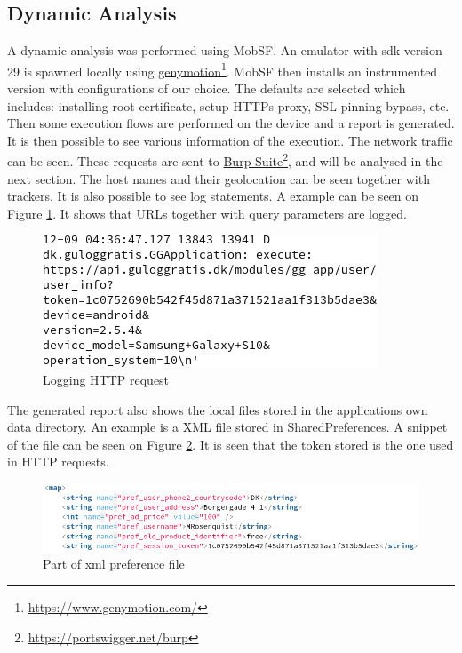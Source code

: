 \subsection{Dynamic Analysis}
A dynamic analysis was performed using MobSF. An emulator with sdk version 29 is spawned locally using \href{https://www.genymotion.com/}{genymotion}\footnote{\href{https://www.genymotion.com/}{https://www.genymotion.com/}}. MobSF then installs an instrumented version with configurations of our choice. The defaults are selected which includes: installing root certificate, setup HTTPs proxy, SSL pinning bypass, etc. Then some execution flows are performed on the device and a report is generated. It is then possible to see various information of the execution. The network traffic can be seen. These requests are sent to \href{https://portswigger.net/burp}{Burp Suite}\footnote{\href{https://portswigger.net/burp}{https://portswigger.net/burp}}, and will be analysed in the next section. The host names and their geolocation can be seen together with trackers. It is also possible to see log statements. A example can be seen on Figure \ref{fig:log-login-request}. It shows that URLs together with query parameters are logged.  

\begin{figure}[htbp]
    \centering
    \includegraphics[width=1\columnwidth]{../static-analysis/pictures/log-login-request.png}
    \caption{Logging HTTP request}
    \label{fig:log-login-request}
\end{figure}

The generated report also shows the local files stored in the applications own data directory. An example is a XML file stored in SharedPreferences. A snippet of the file can be seen on Figure \ref{fig:gull-prefs-xml}. It is seen that the token stored is the one used in HTTP requests.  

\begin{figure}[htbp]
    \centering
    \includegraphics[width=1\columnwidth]{../static-analysis/pictures/gull-prefs-xml.png}
    \caption{Part of xml preference file}
    \label{fig:gull-prefs-xml}
\end{figure}